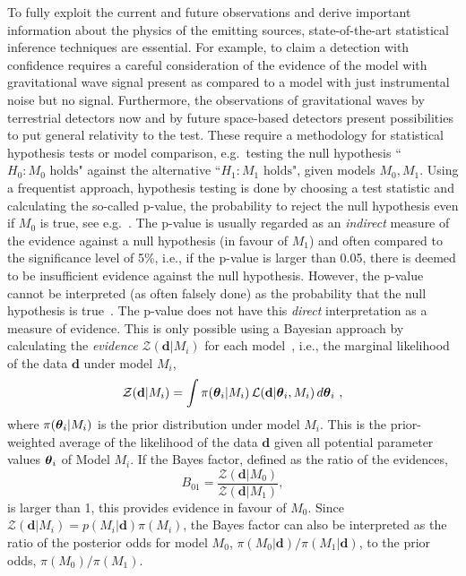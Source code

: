 \documentclass[%
 reprint,
 amsmath,amssymb,
 aps,
]{revtex4-2}
\def\ybold{\mathbf{d}}
\newcommand{\btheta}{\mbox{\boldmath $\theta$}}
\begin{document}
To fully exploit the current and future observations and derive important information about the physics of the emitting sources, state-of-the-art statistical inference techniques are essential. For example, to claim a detection with confidence requires a careful consideration of the evidence of the model with gravitational wave signal present as compared to a model with just instrumental noise but no signal. Furthermore, the observations of gravitational waves by terrestrial detectors now and by future space-based detectors present possibilities to put general relativity to the test. These require a methodology for statistical hypothesis tests or model comparison, e.g.\ testing the null hypothesis ``$H_0: M_0\mbox{ holds}$" against the alternative ``$H_1: M_1 \mbox{ holds}$", given models $M_0, M_1$.  Using a frequentist approach, hypothesis testing is done by
choosing a test statistic and calculating the so-called
p-value, the probability to reject the null hypothesis even if $M_0$ is true, see e.g.\ \cite{alma9998701914002091}. The p-value is usually regarded as an {\em indirect} measure of
the evidence against a null hypothesis (in favour of $M_1$) and often compared to the significance level of 5\%, i.e., if the p-value is larger
than 0.05, there is deemed to be insufficient evidence against the null hypothesis. However, the p-value cannot be interpreted (as often falsely done) as the probability that the null hypothesis is true~\cite{}. The p-value does not have this {\em direct} interpretation as a measure of evidence. This is only possible using a Bayesian approach by calculating the {\em evidence} $\mathcal{Z}(\ybold|M_i)$ for each model~\cite{}, i.e., the marginal likelihood of the data $\ybold$ under model $M_i$,
\begin{equation}
    \mathcal{Z}(\ybold|M_i)=\int \pi(\btheta
_i|M_i)\, \mathcal{L}(\ybold|\btheta_i,M_i)\,d\btheta_i\ ,
\end{equation}
where $\pi(\btheta
_i|M_i)$ is the prior distribution under model $M_i$.
%
This is the prior-weighted average of the likelihood of the data $\ybold$ given all potential parameter values $\btheta_i$ of Model $M_i$.
If the Bayes factor, defined as the ratio of the evidences,
\[ B_{01}=\frac{\mathcal{Z}(\ybold|M_0)}{\mathcal{Z}(\ybold|M_1)},\]
is larger than 1, this provides evidence in favour of $M_0$. Since $\mathcal{Z}(\ybold|M_i)=p(M_i|\ybold)\pi(M_i)$,
the Bayes factor can also be interpreted as the ratio of the posterior odds for model $M_0$, $\pi(M_0|\ybold)/\pi(M_1|\ybold)$, to the prior odds, $\pi(M_0)/\pi(M_1)$.
\end{document}
